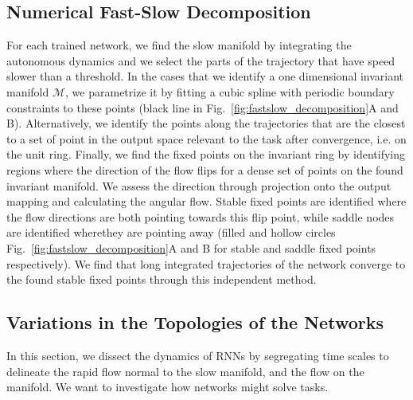 \documentclass{article} %
\newcounter{ct}
\newcommand{\manifold}{\mathcal{M}}
\theoremstyle{definition}
\theoremstyle{remark}
\begin{document}
\subsection{Numerical Fast-Slow Decomposition}\label{sec:fastslowmethod}
For each trained network, we find the slow manifold  by integrating the autonomous dynamics and we select the parts of the trajectory that have speed slower than a threshold.
%
In the cases that we identify a one dimensional invariant manifold $\manifold$, we parametrize it by fitting a cubic spline with periodic boundary constraints to these points (black line in Fig.~\ref{fig:fastslow_decomposition}A and B).
Alternatively, we identify the points along the trajectories that are the closest to a set of point in the output space relevant to the task after convergence, i.e. on the unit ring.
Finally, we find the fixed points on the invariant ring by identifying regions where the direction of the flow flips for a dense set of points on the found invariant manifold.
We assess the direction through projection onto the output mapping and calculating the angular flow.
Stable fixed points are identified where the flow directions are both pointing towards this flip point, 
while saddle nodes are identified wherethey are pointing away (filled and hollow circles Fig.~\ref{fig:fastslow_decomposition}A and B for stable and saddle fixed points respectively).
We find that long integrated trajectories of the network converge to the found stable fixed points through this independent method.


\subsection{Variations in the Topologies of the Networks}\label{sec:topologies}
In this section, we dissect the dynamics of RNNs by segregating time scales to delineate the rapid flow normal to the slow manifold, and the flow on the manifold.
We want to investigate how networks might solve tasks.
\end{document}
